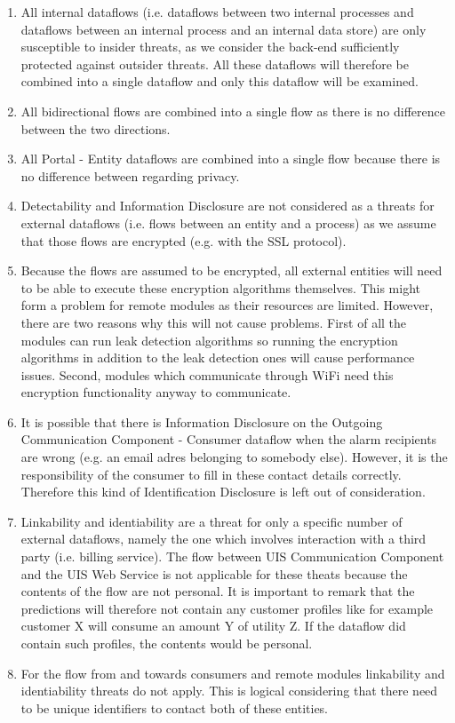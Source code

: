 \begin{enumerate}
  \item All internal dataflows (i.e. dataflows between two internal processes
  and dataflows between an internal process and an internal data store) are only
  susceptible to insider threats, as we consider the back-end sufficiently
  protected against outsider threats. All these dataflows will therefore be
  combined into a single dataflow and only this dataflow will be examined.
  \item All bidirectional flows are combined into a single flow as there is no
  difference between the two directions. 
  \item All Portal - Entity dataflows are combined into a single flow because
  there is no difference between regarding privacy. %
  \item Detectability and Information Disclosure are not considered as a threats
  for external dataflows (i.e. flows between an entity and a process) as we
  assume that those flows are encrypted (e.g. with the SSL protocol).
  \item Because the flows are assumed to be encrypted, all external entities
  will need to be able to execute these encryption algorithms themselves. This
  might form a problem for remote modules as their resources are limited.
  However, there are two reasons why this will not cause problems. First of all
  the modules can run leak detection algorithms so running the encryption
  algorithms in addition to the leak detection ones will cause performance
  issues. Second, modules which communicate through WiFi need this encryption
  functionality anyway to communicate.
  \item It is possible that there is Information Disclosure on the Outgoing
  Communication Component - Consumer dataflow when the alarm recipients are
  wrong (e.g. an email adres belonging to somebody else). However, it is the
  responsibility of the consumer to fill in these contact details correctly.
  Therefore this kind of Identification Disclosure is left out of
  consideration.
  \item Linkability and identiability are a threat for only a specific
  number of external dataflows, namely the one which involves interaction with a
  third party (i.e. billing service). The flow between UIS Communication
  Component and the UIS Web Service is not applicable for these theats
  because the contents of the flow are not personal. It is important to remark
  that the predictions will therefore not contain any customer profiles like
  for example customer X will consume an amount Y of utility Z. If the dataflow
  did contain such profiles, the contents would be personal.
  \item For the flow from and towards consumers and remote modules linkability
  and identiability threats do not apply. This is logical considering that there
  need to be unique identifiers to contact both of these entities.


\end{enumerate}
